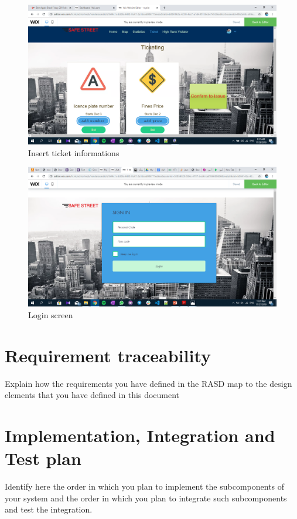 \documentclass{article}
\begin{document}
		\begin{figure}[H]
			\includegraphics[width=\linewidth]{images/ticketing.png}
			\caption{Insert ticket informations}
		\end{figure}
		\begin{figure}[H]
			\includegraphics[width=\linewidth]{images/log in.png}
			\caption{Login screen}
		\end{figure}
	
\section{Requirement traceability}	Explain	how	the	requirements	you	have	defined	in	the	RASD	
map	to the	design	elements	that	you	have	defined	in	this	document
\section{Implementation, Integration and Test plan}	Identify	here	the	order	in	which	you	plan	
to	implement	the	subcomponents	of	your	system	and	the	order	in	which	you	plan	to	integrate	
such	subcomponents	and	test	the	integration.	
\end{document}

